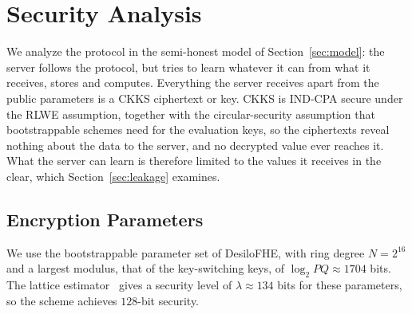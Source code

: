 
\providecommand{\MinPts}{\mathit{MinPts}}
\providecommand{\kmax}{k_{\max}}
\providecommand{\epsn}{\varepsilon_n}
\providecommand{\pk}{\mathsf{pk}}
\providecommand{\sk}{\mathsf{sk}}
\providecommand{\evk}{\mathsf{evk}}
\providecommand{\ct}{\mathsf{ct}}

\section{Security Analysis}\label{sec:security}

We analyze the protocol in the semi-honest model of
Section~\ref{sec:model}: the server follows the protocol, but tries to
learn whatever it can from what it receives, stores and computes.
Everything the server receives apart from the public parameters is a
CKKS ciphertext or key. CKKS is IND-CPA secure under the RLWE assumption,
together with the circular-security assumption that bootstrappable
schemes need for the evaluation keys, so the ciphertexts reveal nothing
about the data to the server, and no decrypted value ever reaches it.
What the server can learn is therefore limited to the
values it receives in the clear, which Section~\ref{sec:leakage}
examines.

\subsection{Encryption Parameters}\label{sec:params}

We use the bootstrappable parameter set of DesiloFHE, with ring degree
$N = 2^{16}$ and a largest modulus, that of the key-switching keys, of
$\log_2 PQ \approx 1704$ bits. The lattice
estimator~\cite{albrecht2015concrete} gives a security level of
$\lambda \approx 134$ bits for these parameters, so the scheme achieves
$128$-bit security.

